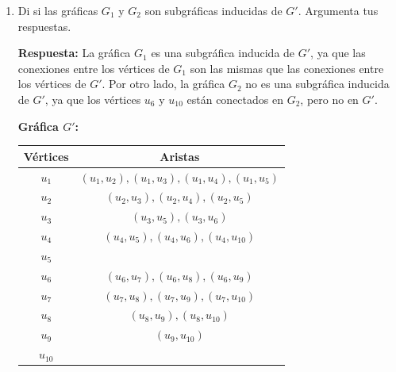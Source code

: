 \documentclass[12pt]{article}
\begin{document}
\begin{enumerate}
\begin{enumerate}
	\item Di si las gráficas \( G_1 \) y \( G_2 \) son subgráficas inducidas de \( G' \). Argumenta tus respuestas.
	      \vspace{1em} %

	      \textbf{Respuesta:} La gráfica \( G_1 \) es una subgráfica inducida de \( G' \), ya que las conexiones entre los vértices de \( G_1 \) son las mismas que las conexiones entre los vértices de \( G' \). Por otro lado, la gráfica \( G_2 \) no es una subgráfica inducida de \( G' \), ya que los vértices \( u_6 \) y \( u_{10} \) están conectados en \( G_2 \), pero no en \( G' \).
	      \vspace{1em} %

	      \textbf{Gráfica \( G' \):}
	      \begin{center}
		      \begin{tabular}{|c|c|}
			      \hline
			      Vértices    & Aristas                                              \\
			      \hline
			      \( u_1 \)   & \( (u_1, u_2), (u_1, u_3) , (u_1, u_4),(u_1, u_5) \) \\
			      \( u_2 \)   & \( (u_2, u_3), (u_2, u_4), (u_2, u_5) \)             \\
			      \( u_3 \)   & \( (u_3, u_5), (u_3,u_6) \)                          \\
			      \( u_4 \)   & \( (u_4, u_5), (u_4,u_6),(u_4,u_{10}) \)             \\
			      \( u_5 \)   & \(  \)                                               \\
			      \( u_6 \)   & \( (u_6, u_7) , (u_6,u_8), (u_6,u_9)\)               \\
			      \(u_7 \)    & \( (u_7, u_8) , (u_7,u_9),(u_7,u_{10}) \)            \\
			      \(u_8 \)    & \( (u_8, u_9) , (u_8,u_{10}) \)                      \\
			      \(u_9 \)    & \( (u_9, u_{10}) \)                                  \\
			      \(u_{10} \) & \(  \)                                               \\
			      \hline
		      \end{tabular}
	      \end{center}

	      \vspace{1em} %


\end{enumerate}
\end{enumerate}
\end{document}
